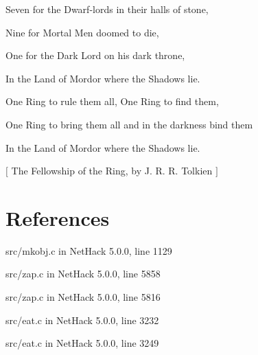 Seven for the Dwarf-{}lords in their halls of stone,$\text{ }$\newline{}

Nine for Mortal Men doomed to die,$\text{ }$\newline{}

One for the Dark Lord on his dark throne,$\text{ }$\newline{}

In the Land of Mordor where the Shadows lie.$\text{ }$\newline{}

One Ring to rule them all, One Ring to find them,$\text{ }$\newline{}

One Ring to bring them all and in the darkness bind them$\text{ }$\newline{}

In the Land of Mordor where the Shadows lie.$\text{ }$\newline{}




{$\text{[}$} The Fellowship of the Ring, by J. R. R. Tolkien {$\text{]}$} 

\section{References}
\label{11}

\begin{myenumerate}
\item{} src/mkobj.c in NetHack 5.0.0, line 1129\footnotemark[119]
     

\item{} src/zap.c in NetHack 5.0.0, line 5858\footnotemark[120]
     

\item{} src/zap.c in NetHack 5.0.0, line 5816\footnotemark[121]
     

\item{} src/eat.c in NetHack 5.0.0, line 3232\footnotemark[122]
     

\item{} src/eat.c in NetHack 5.0.0, line 3249\footnotemark[123]
     


\end{myenumerate}


